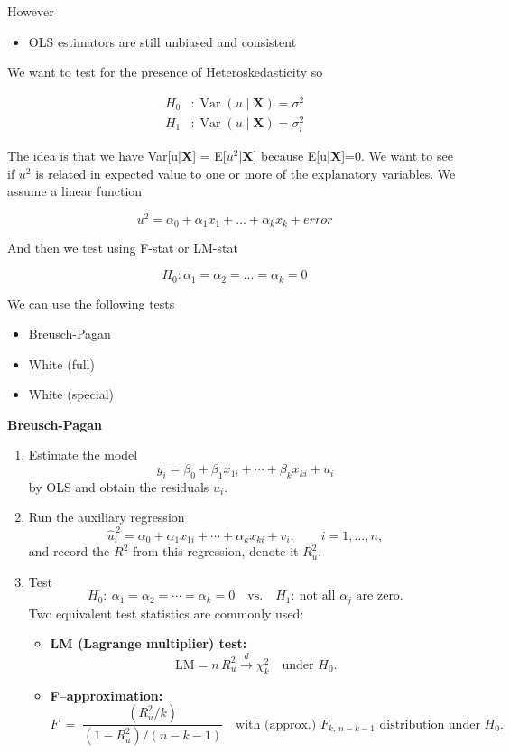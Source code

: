 However 

\begin{itemize}
    \item OLS estimators are still unbiased and consistent
\end{itemize}

We want to test for the presence of Heteroskedasticity so

\[
\begin{aligned}
H_0 &: \operatorname{Var}(u \mid \mathbf{X}) = \sigma^2 \\
H_1 &: \operatorname{Var}(u \mid \mathbf{X}) = \sigma_i^2
\end{aligned}
\]


The idea is that we have Var[u|\textbf{X}] = E[$u^2$|\textbf{X}] because E[u|\textbf{X}]=0. We want to see if $u^2$ is related in expected value to one or more of the explanatory variables. We assume a linear function

\[
u^2 = \alpha_0 + \alpha_1 x_1 + ... + \alpha_k x_k + error
\]

And then we test using F-stat or LM-stat 

\[
H_0 : \alpha_1 = \alpha_2 = ... = \alpha_k = 0
\]


We can use the following tests

\begin{itemize}
    \item Breusch-Pagan
    \item White (full)
    \item White (special)
\end{itemize}

\textbf{Breusch-Pagan}

\begin{enumerate}
  \item Estimate the model
  \[
    y_i = \beta_0 + \beta_1 x_{1i} + \cdots + \beta_k x_{ki} + u_i
  \]
  by OLS and obtain the residuals $\hat{u}_i$.
  \item Run the auxiliary regression
  \[
    \hat{u}_i^{\,2} = \alpha_0 + \alpha_1 x_{1i} + \cdots + \alpha_k x_{ki} + v_i,
    \qquad i=1,\dots,n,
  \]
  and record the $R^2$ from this regression, denote it $R_u^2$.
  \item Test
  \[
    H_0:\ \alpha_1=\alpha_2=\cdots=\alpha_k=0
    \quad\text{vs.}\quad
    H_1:\ \text{not all }\alpha_j\text{ are zero.}
  \]
  Two equivalent test statistics are commonly used:
  \begin{itemize}
    \item \textbf{LM (Lagrange multiplier) test:}
    \[
      \mathrm{LM} = n\,R_u^2 \xrightarrow{d} \chi^2_{k}\quad\text{under }H_0.
    \]
    \item \textbf{F–approximation:}
    \[
      F \;=\; 
      \frac{(R_u^2/k)}{(1-R_u^2)/(n-k-1)}
      \quad\text{with (approx.) }F_{k,\,n-k-1}\text{ distribution under }H_0.
    \]
  \end{itemize}
\end{enumerate}


